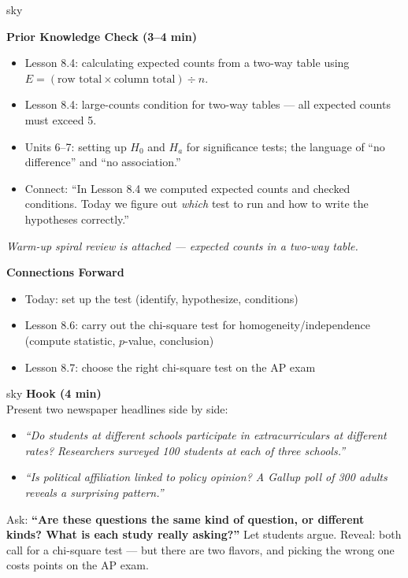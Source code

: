 \documentclass[10pt]{article}
\begin{document}
\begin{skillbox}{sky}
\begin{minipage}[t]{0.55\linewidth}
    \textbf{Prior Knowledge Check (3--4 min)}
    \begin{itemize}
        \item Lesson 8.4: calculating expected counts from a two-way table using
              $E = (\text{row total} \times \text{column total}) \div n$.
        \item Lesson 8.4: large-counts condition for two-way tables --- all expected
              counts must exceed 5.
        \item Units 6--7: setting up $H_0$ and $H_a$ for significance tests; the
              language of ``no difference'' and ``no association.''
        \item Connect: ``In Lesson 8.4 we computed expected counts and checked
              conditions. Today we figure out \emph{which} test to run and how to
              write the hypotheses correctly.''
    \end{itemize}
    \textit{Warm-up spiral review is attached --- expected counts in a two-way table.}
\end{minipage}
\hfill
\begin{minipage}[t]{0.38\linewidth}
    \textbf{Connections Forward}
    \begin{itemize}
        \item Today: set up the test (identify, hypothesize, conditions)
        \item Lesson 8.6: carry out the chi-square test for homogeneity/independence
              (compute statistic, $p$-value, conclusion)
        \item Lesson 8.7: choose the right chi-square test on the AP exam
    \end{itemize}
\end{minipage}
\end{skillbox}

\begin{skillbox}[Hook]{sky}
    \textbf{Hook (4 min)}\\
    Present two newspaper headlines side by side:
    \begin{itemize}
        \item \textit{``Do students at different schools participate in extracurriculars
              at different rates? Researchers surveyed 100 students at each of three schools.''}
        \item \textit{``Is political affiliation linked to policy opinion? A Gallup poll of
              300 adults reveals a surprising pattern.''}
    \end{itemize}
    Ask: \textbf{``Are these questions the same kind of question, or different kinds?
    What is each study really asking?''} Let students argue. Reveal: both call for a
    chi-square test --- but there are two flavors, and picking the wrong one costs
    points on the AP exam.
\end{skillbox}
\end{document}
